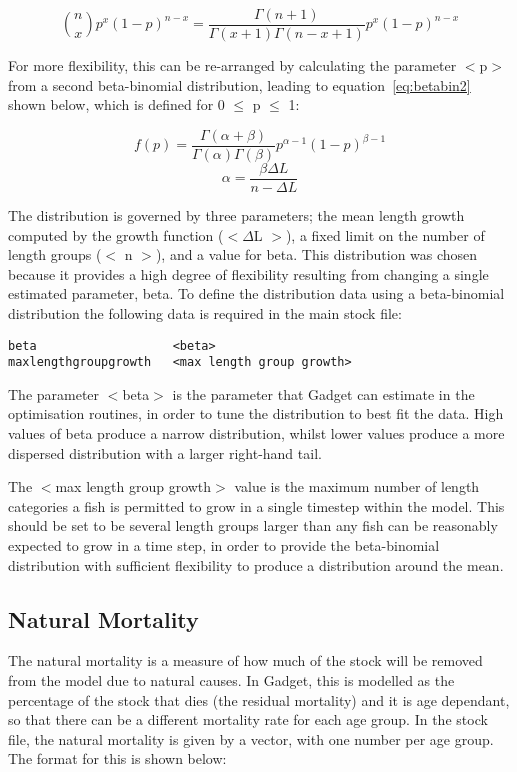 \documentclass [a4paper, 10pt]{book}
\begin{document}
\begin{equation}\label{eq:betabin1}
{n \choose x}p^x (1-p)^{n-x} = \frac{\Gamma(n+1)}{\Gamma(x+1)\Gamma(n-x+1)}p^x(1-p)^{n-x}
\end{equation}

For more flexibility, this can be re-arranged by calculating the parameter $<$p$>$ from a second beta-binomial distribution, leading to equation~\ref{eq:betabin2} shown below, which is defined for 0 $\le$ p $\le$ 1:

\begin{equation}\label{eq:betabin2}
f(p)=\frac{\Gamma(\alpha+\beta)}{\Gamma(\alpha)\Gamma(\beta)}p^{\alpha-1}(1-p)^{\beta-1}
\end{equation}
\begin{equation}\label{eq:betabin3}
\alpha=\frac{\beta\Delta L}{n-\Delta L}
\end{equation}

The distribution is governed by three parameters; the mean length growth computed by the growth function ($<\Delta$L $>$), a fixed limit on the number of length groups ($<$ n $>$), and a value for beta.  This distribution was chosen because it provides a high degree of flexibility resulting from changing a single estimated parameter, beta.  To define the distribution data using a beta-binomial distribution the following data is required in the main stock file:

{\small\begin{verbatim}
beta                   <beta>
maxlengthgroupgrowth   <max length group growth>
\end{verbatim}}

The parameter $<$beta$>$ is the parameter that Gadget can estimate in the optimisation routines, in order to tune the distribution to best fit the data.  High values of beta produce a narrow distribution, whilst lower values produce a more dispersed distribution with a larger right-hand tail.

\bigskip
The $<$max length group growth$>$ value is the maximum number of length categories a fish is permitted to grow in a single timestep within the model.  This should be set to be several length groups larger than any fish can be reasonably expected to grow in a time step, in order to provide the beta-binomial distribution with sufficient flexibility to produce a distribution around the mean.

\subsection{Natural Mortality}\label{subsec:stocknatmort}
The natural mortality is a measure of how much of the stock will be removed from the model due to natural causes.  In Gadget, this is modelled as the percentage of the stock that dies (the residual mortality) and it is age dependant, so that there can be a different mortality rate for each age group.  In the stock file, the natural mortality is given by a vector, with one number per age group.  The format for this is shown below:
\end{document}
